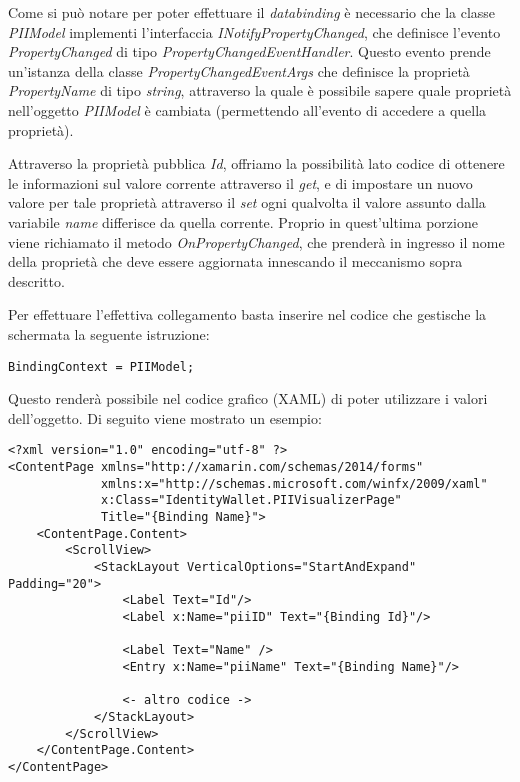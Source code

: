 Come si può notare per poter effettuare il \emph{databinding} è necessario che la classe \emph{PIIModel} implementi l’interfaccia \emph{INotifyPropertyChanged}, che definisce l’evento \emph{PropertyChanged} di tipo \emph{PropertyChangedEventHandler}. Questo evento prende un’istanza della classe \emph{PropertyChangedEventArgs} che definisce la proprietà \emph{PropertyName} di tipo \emph{string}, attraverso la quale è possibile sapere quale proprietà nell'oggetto \emph{PIIModel} è cambiata (permettendo all’evento di accedere a quella proprietà).

Attraverso la proprietà pubblica \emph{Id}, offriamo la possibilità lato codice di ottenere le informazioni sul valore corrente attraverso il \emph{get}, e di impostare un nuovo valore per tale proprietà attraverso il \emph{set} ogni qualvolta il valore assunto dalla variabile \emph{name} differisce da quella corrente. Proprio in quest’ultima porzione viene richiamato il metodo \emph{OnPropertyChanged}, che prenderà in ingresso il nome della proprietà che deve essere aggiornata innescando il meccanismo sopra descritto. 

Per effettuare l'effettiva collegamento basta inserire nel codice che gestische la schermata la seguente istruzione:
\begin{lstlisting}[caption={codice di connessione}]
    BindingContext = PIIModel;
\end{lstlisting}

Questo renderà possibile nel codice grafico (XAML) di poter utilizzare i valori dell'oggetto. Di seguito viene mostrato un esempio:

\begin{lstlisting}[caption={esempio di vista che usa il databinding}]
<?xml version="1.0" encoding="utf-8" ?>
<ContentPage xmlns="http://xamarin.com/schemas/2014/forms"
             xmlns:x="http://schemas.microsoft.com/winfx/2009/xaml"
             x:Class="IdentityWallet.PIIVisualizerPage"
             Title="{Binding Name}">
    <ContentPage.Content>
        <ScrollView>
            <StackLayout VerticalOptions="StartAndExpand" Padding="20">
                <Label Text="Id"/>
                <Label x:Name="piiID" Text="{Binding Id}"/>
            
                <Label Text="Name" />
                <Entry x:Name="piiName" Text="{Binding Name}"/>
            
                <- altro codice ->
            </StackLayout>
        </ScrollView>
    </ContentPage.Content>
</ContentPage>
\end{lstlisting}

